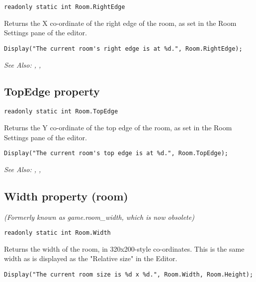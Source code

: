 \begin{verbatim}
readonly static int Room.RightEdge
\end{verbatim}
Returns the X co-ordinate of the right edge of the room, as set in the Room Settings
pane of the editor.

\begin{verbatim}
Display("The current room's right edge is at %d.", Room.RightEdge);
\end{verbatim}

\it{See Also:} , ,


\subsection{TopEdge property}\label{Room.TopEdge}%

\begin{verbatim}
readonly static int Room.TopEdge
\end{verbatim}
Returns the Y co-ordinate of the top edge of the room, as set in the Room Settings
pane of the editor.

\begin{verbatim}
Display("The current room's top edge is at %d.", Room.TopEdge);
\end{verbatim}

\it{See Also:} , ,


\subsection{Width property (room)}\label{Room.Width}%

\it{(Formerly known as game.room_width, which is now obsolete)}

\begin{verbatim}
readonly static int Room.Width
\end{verbatim}
Returns the width of the room, in 320x200-style co-ordinates. This is
the same width as is displayed as the "Relative size" in the Editor.

\begin{verbatim}
Display("The current room size is %d x %d.", Room.Width, Room.Height);
\end{verbatim}

